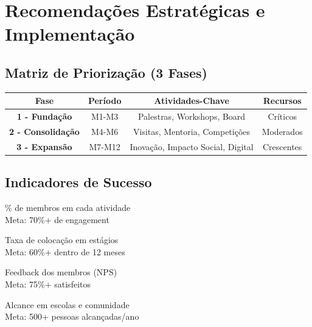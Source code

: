 \documentclass[12pt,a4paper,oneside]{article}
\begin{document}
\section{Recomendações Estratégicas e Implementação}

\subsection{Matriz de Priorização (3 Fases)}

\begin{center}
\begin{tabular}{|c|c|c|c|}
\hline
\textbf{\color{spe-primary}Fase} & \textbf{\color{spe-primary}Período} & \textbf{\color{spe-primary}Atividades-Chave} & \textbf{\color{spe-primary}Recursos} \\
\hline
\color{spe-accent}\textbf{1 - Fundação} & \textcolor{spe-accent}{M1-M3} & Palestras, Workshops, Board & Críticos \\
\hline
\color{spe-accent}\textbf{2 - Consolidação} & \textcolor{spe-accent}{M4-M6} & Visitas, Mentoria, Competições & Moderados \\
\hline
\color{spe-accent}\textbf{3 - Expansão} & \textcolor{spe-accent}{M7-M12} & Inovação, Impacto Social, Digital & Crescentes \\
\hline
\end{tabular}
\end{center}

\vspace{1.5cm}

\subsection{Indicadores de Sucesso}

\begin{tcbraster}[raster columns=2, nobeforeafter]

\begin{tcolorbox}[title=Participação, colback=spe-light, boxrule=0.5pt]
  \% de membros em cada atividade\\
  Meta: 70\%+ de engagement
\end{tcolorbox}

\begin{tcolorbox}[title=Empregabilidade, colback=spe-light, boxrule=0.5pt]
  Taxa de colocação em estágios\\
  Meta: 60\%+ dentro de 12 meses
\end{tcolorbox}

\begin{tcolorbox}[title=Satisfação, colback=spe-light, boxrule=0.5pt]
  Feedback dos membros (NPS)\\
  Meta: 75\%+ satisfeitos
\end{tcolorbox}

\begin{tcolorbox}[title=Impacto Social, colback=spe-light, boxrule=0.5pt]
  Alcance em escolas e comunidade\\
  Meta: 500+ pessoas alcançadas/ano
\end{tcolorbox}

\end{tcbraster}
\end{document}
